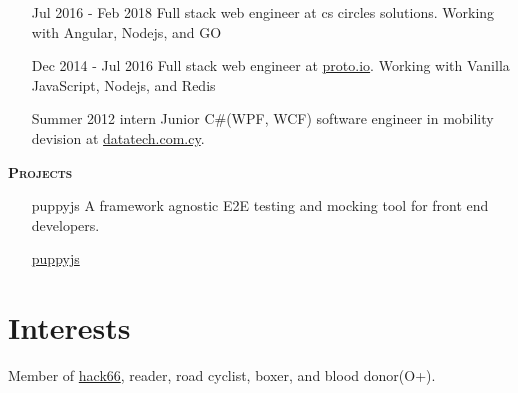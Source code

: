 \documentclass[margin, 11pt]{res} %
\begin{document}
\begin{resume}
\begin{itemize}
            \item[Jul 2016 - Feb 2018] Full stack web engineer at cs circles solutions.
            Working with Angular, Nodejs, and GO

            \item[Dec 2014 - Jul 2016] Full stack web engineer at \href{https://proto.io/}{proto.io}.
            Working with Vanilla JavaScript, Nodejs, and Redis

            \item[Summer 2012 intern] Junior C\#(WPF, WCF) software engineer in mobility devision at \href{http://www.datatech.com.cy/}{datatech.com.cy}.

        \end{itemize}

        \textsc{ \textbf{Projects}}

        \begin{itemize}

            \item[puppyjs] A framework agnostic E2E testing and mocking tool for front end developers.

            \href{https://github.com/michaelthe/puppyjs}{puppyjs}

        \end{itemize}

        \section{Interests}\label{sec:interests}

        Member of \href{http://hack66.info/}{hack66}, reader, road cyclist, boxer, and blood donor(O+).

    \end{resume}
\end{document}
